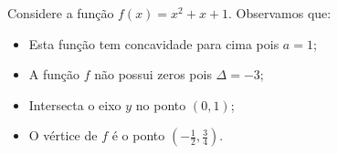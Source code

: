  \begin{exem}
 Considere a função $f(x)= x^2+x+1$. Observamos que:
 \begin{itemize}
     \item Esta função tem concavidade para cima pois $a=1$;
     \item A função $f$ não possui zeros pois $\Delta=-3$;
     \item Intersecta o eixo $y$ no ponto $(0,1)$;
     \item O vértice de $f$ é o ponto $(-\frac{1}{2}, \frac{3}{4})$.
 \end{itemize}


  \begin{center}
\end{center}
  
 \end{exem}
 

